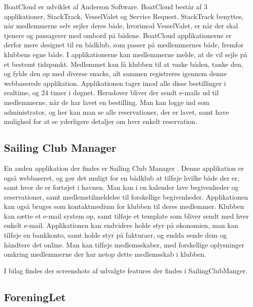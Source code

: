 BoatCloud er udviklet af Anderson Software. \citep{BoatCloud} 
BoatCloud består af 3 applikationer, StackTrack, VesselValet og Service Request. 
StackTrack benyttes, når medlemmerne selv sejler deres både, hvorimod VesselValet, er når der skal tjenere og passagerer med ombord på bådene. 
BoatCloud applikationerne er derfor mere designet til
en bådklub, som passer på medlemmernes både, fremfor klubbens egne både. 
I applikationerne kan medlemmerne melde, at de vil sejle på et bestemt tidspunkt. 
Medlemmet kan få klubben til at vaske båden, tanke den, og
fylde den op med diverse snacks, alt sammen registreres igennem denne webbaserede applikation. 
Applikationen tager imod alle disse bestillinger i realtime, og 24 timer i døgnet. 
Herudover bliver der sendt e-mails ud til medlemmerne, når de har lavet en bestilling. 
Man kan logge ind som administrator, og her kan man se alle reservationer, der er lavet, samt have mulighed for at se yderligere detaljer om hver enkelt reservation.


\subsection*{Sailing Club Manager}

En anden applikation der findes er Sailing Club Manager \citep{SailClub}. 
Denne applikation er også webbaseret, og gør det muligt for en bådklub at tilføje hvilke både der er, samt hvor de er fortøjet i havnen. 
Man kan i en kalender lave begivenheder og reservationer, samt medlemstilmeldelse til forskellige begivenheder. Applikationen kan også bruges som kontaktmedium for klubben til deres medlemmer. 
Klubben kan sætte et e-mail system op, samt tilføje et template som bliver sendt med hver enkelt e-mail. Applikationen kan endvidere holde styr på økonomien, man kan tilføje en bankkonto, samt  holde styr på fakturaer, og endda sende dem og håndtere det online. 
Man kan tilføje medlemsskaber, med forskellige oplysninger omkring medlemmerne der har netop dette medlemsskab i klubben.

I bilag  findes der screenshots af udvalgte features der findes i SailingClubManger.

\subsection*{ForeningLet}

